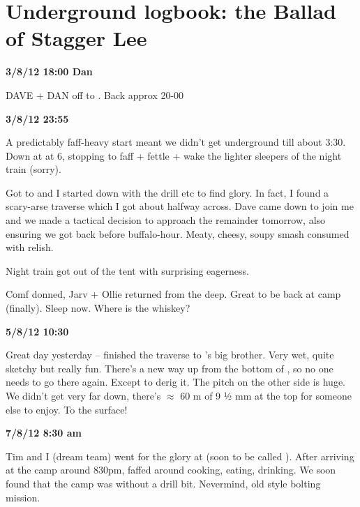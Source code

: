 \section{Underground logbook: the Ballad of Stagger Lee}

\textbf{3/8/12 18:00 Dan}

DAVE + DAN off to . Back approx 20-00

\textbf{3/8/12 23:55}

A predictably faff-heavy start meant we didn't get underground till
about 3:30. Down at  at 6, stopping to faff + fettle + wake the lighter sleepers of the night train (sorry).

Got to  and I started down with the drill etc to find glory. In fact, I found a scary-arse traverse which I got about halfway across. Dave came down to join me and we made a tactical decision to approach the remainder tomorrow, also ensuring we got back before buffalo-hour. Meaty, cheesy, soupy smash consumed with relish.

Night train got out of the tent with surprising eagerness.

Comf donned, Jarv + Ollie returned from the deep. Great to be back at camp (finally). Sleep now. Where is the whiskey?


\textbf{5/8/12 10:30}

Great day yesterday -- finished the traverse to 's big brother. Very wet, quite sketchy but really fun. There's a new way up from the bottom of , so no one needs to go there again. Except to derig it. The pitch on the other side is huge. We didn't get very far down, there's $\approx$ 60 m of 9 ½ mm at the top for someone else to enjoy. To the surface!


\textbf{7/8/12 8:30 am}

Tim and I (dream team) went for the glory at  (soon to be
called ). After arriving at the camp around 830pm, faffed around cooking, eating, drinking. We soon found that the camp was without a drill bit. Nevermind, old style bolting mission.

